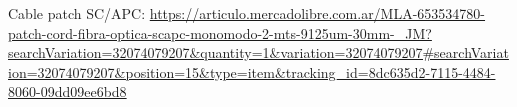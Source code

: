 \begin{thebibliography}{99}



 Cable patch SC/APC: \url{https://articulo.mercadolibre.com.ar/MLA-653534780-patch-cord-fibra-optica-scapc-monomodo-2-mts-9125um-30mm-_JM?searchVariation=32074079207&quantity=1&variation=32074079207#searchVariation=32074079207&position=15&type=item&tracking_id=8dc635d2-7115-4484-8060-09dd09ee6bd8}



\end{thebibliography}




\newpage
